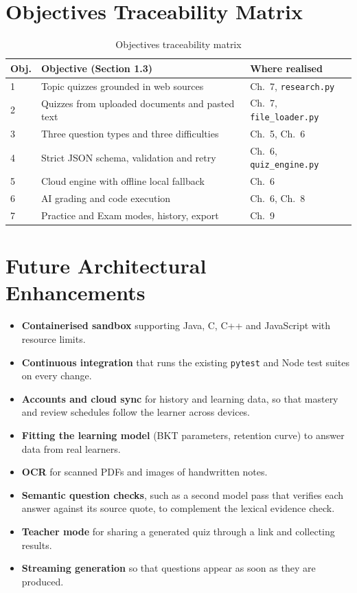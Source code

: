 \section{Objectives Traceability Matrix}
\begin{table}[H]
\centering
\begin{tabularx}{\textwidth}{@{} p{1.3cm} X p{3.6cm} @{}}
\toprule
\textbf{Obj.} & \textbf{Objective (Section 1.3)} & \textbf{Where realised} \\
\midrule
1 & Topic quizzes grounded in web sources & Ch.~7, \texttt{research.py} \\
2 & Quizzes from uploaded documents and pasted text & Ch.~7, \texttt{file\_loader.py} \\
3 & Three question types and three difficulties & Ch.~5, Ch.~6 \\
4 & Strict JSON schema, validation and retry & Ch.~6, \texttt{quiz\_engine.py} \\
5 & Cloud engine with offline local fallback & Ch.~6 \\
6 & AI grading and code execution & Ch.~6, Ch.~8 \\
7 & Practice and Exam modes, history, export & Ch.~9 \\
\bottomrule
\end{tabularx}
\caption{Objectives traceability matrix}
\label{tab:trace}
\end{table}

\section{Future Architectural Enhancements}
\begin{itemize}
\item \textbf{Containerised sandbox} supporting Java, C, C++ and JavaScript with resource limits.
\item \textbf{Continuous integration} that runs the existing \texttt{pytest} and Node test suites on every change.
\item \textbf{Accounts and cloud sync} for history and learning data, so that mastery and review schedules follow the learner across devices.
\item \textbf{Fitting the learning model} (BKT parameters, retention curve) to answer data from real learners.
\item \textbf{OCR} for scanned PDFs and images of handwritten notes.
\item \textbf{Semantic question checks}, such as a second model pass that verifies each answer against its source quote, to complement the lexical evidence check.
\item \textbf{Teacher mode} for sharing a generated quiz through a link and collecting results.
\item \textbf{Streaming generation} so that questions appear as soon as they are produced.
\end{itemize}
